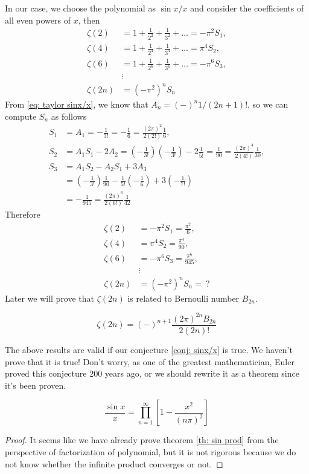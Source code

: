 \documentclass[10pt]{article}
\begin{document}
	In our case, we choose the polynomial as $\sin x /x$ and consider the coefficients of all even powers of $x$, then
	\begin{align*}
		\zeta(2) &= 1 + \frac{1}{2^2} + \frac{1}{3^2} + \dots = - \pi^2 S_1, \\
		\zeta(4) &= 1 + \frac{1}{2^4} + \frac{1}{3^4} + \dots = \pi^4 S_2, \\
		\zeta(6) &= 1 + \frac{1}{2^6} + \frac{1}{3^6} + \dots = - \pi^6 S_3, \\
		&\vdots \\
		\zeta(2n) &= (-\pi^2)^n S_n
	\end{align*}
	From \eqref{eq: taylor sinx/x}, we know that $A_n = (-)^n 1/(2n+1)!$, so we can compute $S_n$ as follows
	\begin{align*}
		S_1 &= A_1 = -\frac{1}{3!} = -\frac{1}{6} = \frac{(2\pi)^{2}}{2(2!)} \frac{1}{6}, \\
		S_2 &= A_1 S_1 - 2 A_2 =  \left(-\frac{1}{3!}\right)\left(-\frac{1}{3!}\right) - 2 \frac{1}{5!} = \frac{1}{90} = \frac{(2\pi)^{4}}{2(4!)} \frac{1}{30}, \\
		S_3 &= A_1 S_2 - A_2 S_1 + 3 A_3 \\
		&= \left(-\frac{1}{3!}\right) \frac{1}{90} - \frac{1}{5!} \left(- \frac{1}{6} \right) + 3 \left(-\frac{1}{7!}\right) \\
		&= -\frac{1}{945} = \frac{(2\pi)^{6}}{2(6!)} \frac{1}{42}
	\end{align*}
	Therefore
	\begin{align*}
		\zeta(2) &= - \pi^2 S_1 = \frac{\pi^2}{6}, \\
		\zeta(4) &= \pi^4 S_2 = \frac{\pi^4}{90}, \\
		\zeta(6) &= - \pi^6 S_3 = \frac{\pi^6}{945}, \\
		&\vdots \\
		\zeta(2n) &= (-\pi^2)^n S_n = \ ?
	\end{align*}
	Later we will prove that $\zeta(2n)$ is related to Bernoulli number $B_{2n}$.
	\begin{theorem}
		\begin{equation}
			\zeta(2n) = (-)^{n+1} \frac{(2\pi)^{2n} B_{2n}}{2(2n)!}
		\end{equation}
	\end{theorem}
	The above results are valid if our conjecture \eqref{conj: sinx/x} is true. We haven't prove that it is true! Don't worry, as one of the greatest mathematician, Euler proved this conjecture 200 years ago, or we should rewrite it as a theorem since it's been proven.
	\begin{theorem} \label{th: sin prod}
		\begin{equation}
			\frac{\sin{x}}{x} = \prod_{n=1}^{\infty} \left[ 1 - \frac{x^2}{(n\pi)^2} \right]
		\end{equation}
	\end{theorem}
	\begin{proof}
		It seems like we have already prove theorem \ref{th: sin prod} from the perspective of factorization of polynomial, but it is not rigorous because we do not know whether the infinite product converges or not.
	\end{proof}
\end{document}
